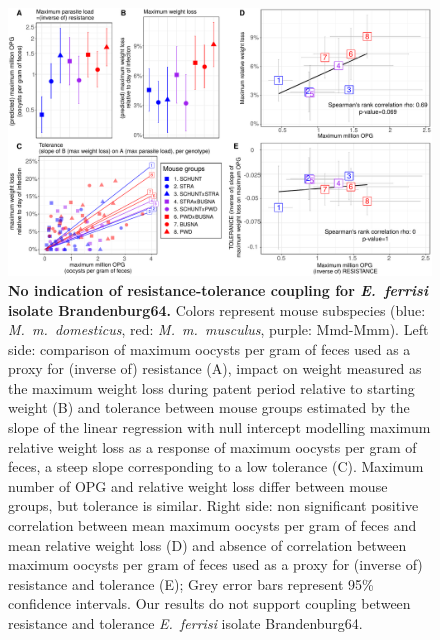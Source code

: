 \documentclass[12pt]{article}
\begin{document}
\begin{figure}[H]
    \centering
    \includegraphics[width=\linewidth,height=\textheight,keepaspectratio]{images/Fig4_final.pdf}
    \caption{\textbf{No indication of resistance-tolerance coupling for \textit{E.~ferrisi} isolate Brandenburg64.} Colors represent mouse subspecies (blue: \textit{M.~m.~domesticus}, red: \textit{M.~m.~musculus}, purple: Mmd-Mmm). Left side: comparison of maximum oocysts per gram of feces used as a proxy for (inverse of) resistance (A), impact on weight measured as the maximum weight loss during patent period relative to starting weight (B) and tolerance between mouse groups estimated by the slope of the linear regression with null intercept modelling maximum relative weight loss as a response of maximum oocysts per gram of feces, a steep slope corresponding to a low tolerance (C). Maximum number of OPG and relative weight loss differ between mouse groups, but tolerance is similar. Right side: non significant positive correlation between mean maximum oocysts per gram of feces and mean relative weight loss (D) and absence of correlation between maximum oocysts per gram of feces used as a proxy for (inverse of) resistance and tolerance (E); Grey error bars represent 95\% confidence intervals. Our results do not support coupling between resistance and tolerance \textit{E.~ferrisi} isolate Brandenburg64.}
\end{figure}
\end{document}
